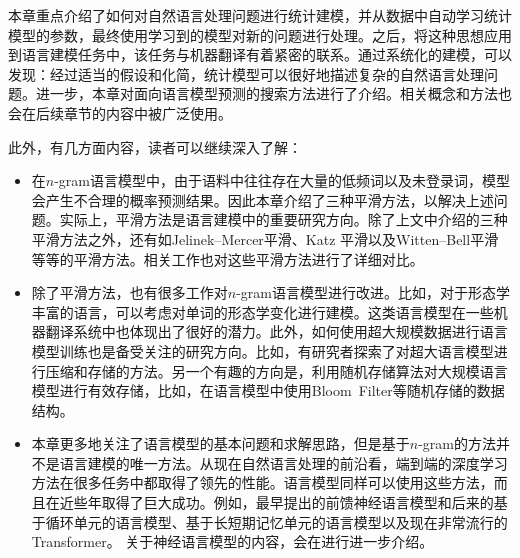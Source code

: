 \parinterval 本章重点介绍了如何对自然语言处理问题进行统计建模，并从数据中自动学习统计模型的参数，最终使用学习到的模型对新的问题进行处理。之后，将这种思想应用到语言建模任务中，该任务与机器翻译有着紧密的联系。通过系统化的建模，可以发现：经过适当的假设和化简，统计模型可以很好地描述复杂的自然语言处理问题。进一步，本章对面向语言模型预测的搜索方法进行了介绍。相关概念和方法也会在后续章节的内容中被广泛使用。

\parinterval 此外，有几方面内容，读者可以继续深入了解：

\begin{adjustwidth}{1em}{}
\begin{itemize}
\vspace{0.5em}
\item 在$n$-gram语言模型中，由于语料中往往存在大量的低频词以及未登录词，模型会产生不合理的概率预测结果。因此本章介绍了三种平滑方法，以解决上述问题。实际上，平滑方法是语言建模中的重要研究方向。除了上文中介绍的三种平滑方法之外，还有如Jelinek–Mercer平滑、Katz 平滑以及Witten–Bell平滑等等的平滑方法。相关工作也对这些平滑方法进行了详细对比。
\vspace{0.5em}
\item 除了平滑方法，也有很多工作对$n$-gram语言模型进行改进。比如，对于形态学丰富的语言，可以考虑对单词的形态学变化进行建模。这类语言模型在一些机器翻译系统中也体现出了很好的潜力。此外，如何使用超大规模数据进行语言模型训练也是备受关注的研究方向。比如，有研究者探索了对超大语言模型进行压缩和存储的方法。另一个有趣的方向是，利用随机存储算法对大规模语言模型进行有效存储，比如，在语言模型中使用Bloom\ Filter等随机存储的数据结构。
\vspace{0.5em}
\item 本章更多地关注了语言模型的基本问题和求解思路，但是基于$n$-gram的方法并不是语言建模的唯一方法。从现在自然语言处理的前沿看，端到端的深度学习方法在很多任务中都取得了领先的性能。语言模型同样可以使用这些方法，而且在近些年取得了巨大成功。例如，最早提出的前馈神经语言模型和后来的基于循环单元的语言模型、基于长短期记忆单元的语言模型以及现在非常流行的Transformer。 关于神经语言模型的内容，会在{\chapternine}进行进一步介绍。
\vspace{0.5em}

\end{itemize}
\end{adjustwidth}
